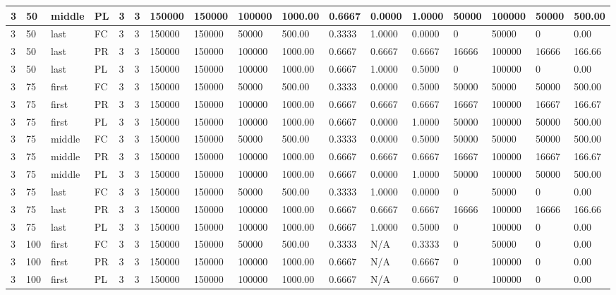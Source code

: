 \begin{tabular}{|l|l|l|l|l|l|l|l|l|l|l|l|l|l|l|l|l|}
3 & 50 & middle & PL & 3 & 3 & 150000 & 150000 & 100000 & 1000.00 & 0.6667 & 0.0000 & 1.0000 & 50000 & 100000 & 50000 & 500.00 \\ \hline
3 & 50 & last & FC & 3 & 3 & 150000 & 150000 & 50000 & 500.00 & 0.3333 & 1.0000 & 0.0000 & 0 & 50000 & 0 & 0.00 \\ \hline
3 & 50 & last & PR & 3 & 3 & 150000 & 150000 & 100000 & 1000.00 & 0.6667 & 0.6667 & 0.6667 & 16666 & 100000 & 16666 & 166.66 \\ \hline
3 & 50 & last & PL & 3 & 3 & 150000 & 150000 & 100000 & 1000.00 & 0.6667 & 1.0000 & 0.5000 & 0 & 100000 & 0 & 0.00 \\ \hline
3 & 75 & first & FC & 3 & 3 & 150000 & 150000 & 50000 & 500.00 & 0.3333 & 0.0000 & 0.5000 & 50000 & 50000 & 50000 & 500.00 \\ \hline
3 & 75 & first & PR & 3 & 3 & 150000 & 150000 & 100000 & 1000.00 & 0.6667 & 0.6667 & 0.6667 & 16667 & 100000 & 16667 & 166.67 \\ \hline
3 & 75 & first & PL & 3 & 3 & 150000 & 150000 & 100000 & 1000.00 & 0.6667 & 0.0000 & 1.0000 & 50000 & 100000 & 50000 & 500.00 \\ \hline
3 & 75 & middle & FC & 3 & 3 & 150000 & 150000 & 50000 & 500.00 & 0.3333 & 0.0000 & 0.5000 & 50000 & 50000 & 50000 & 500.00 \\ \hline
3 & 75 & middle & PR & 3 & 3 & 150000 & 150000 & 100000 & 1000.00 & 0.6667 & 0.6667 & 0.6667 & 16667 & 100000 & 16667 & 166.67 \\ \hline
3 & 75 & middle & PL & 3 & 3 & 150000 & 150000 & 100000 & 1000.00 & 0.6667 & 0.0000 & 1.0000 & 50000 & 100000 & 50000 & 500.00 \\ \hline
3 & 75 & last & FC & 3 & 3 & 150000 & 150000 & 50000 & 500.00 & 0.3333 & 1.0000 & 0.0000 & 0 & 50000 & 0 & 0.00 \\ \hline
3 & 75 & last & PR & 3 & 3 & 150000 & 150000 & 100000 & 1000.00 & 0.6667 & 0.6667 & 0.6667 & 16666 & 100000 & 16666 & 166.66 \\ \hline
3 & 75 & last & PL & 3 & 3 & 150000 & 150000 & 100000 & 1000.00 & 0.6667 & 1.0000 & 0.5000 & 0 & 100000 & 0 & 0.00 \\ \hline
3 & 100 & first & FC & 3 & 3 & 150000 & 150000 & 50000 & 500.00 & 0.3333 & N/A & 0.3333 & 0 & 50000 & 0 & 0.00 \\ \hline
3 & 100 & first & PR & 3 & 3 & 150000 & 150000 & 100000 & 1000.00 & 0.6667 & N/A & 0.6667 & 0 & 100000 & 0 & 0.00 \\ \hline
3 & 100 & first & PL & 3 & 3 & 150000 & 150000 & 100000 & 1000.00 & 0.6667 & N/A & 0.6667 & 0 & 100000 & 0 & 0.00 \\ \hline

\end{tabular}
